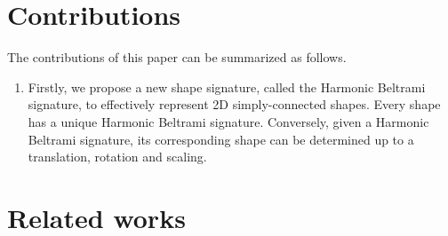 \documentclass[review,onefignum,onetabnum]{siamonline190516}
\begin{document}
\section{Contributions}
The contributions of this paper can be summarized as follows.
\begin{enumerate}
    \item Firstly, we propose a new shape signature, called the Harmonic Beltrami signature, to effectively represent 2D simply-connected shapes. Every shape has a unique Harmonic Beltrami signature. Conversely, given a Harmonic Beltrami signature, its corresponding shape can be determined up to a translation, rotation and scaling.
\end{enumerate}

\section{Related works}\label{related work}
\end{document}
